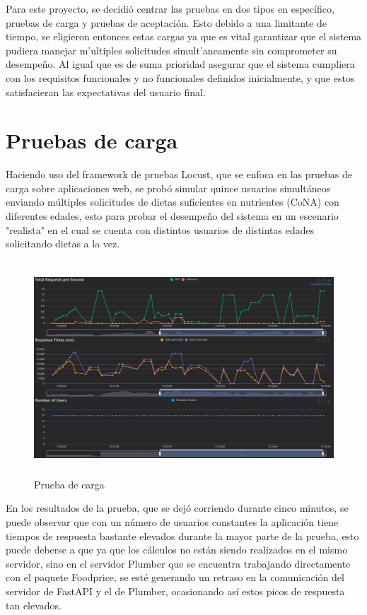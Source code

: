 
\noindent Para este proyecto, se decidi\'o centrar las pruebas en dos tipos en espec\'ifico, pruebas de carga y pruebas de aceptaci\'on. Esto  debido a una limitante de tiempo, se eligieron entonces estas cargas ya que es vital garantizar que el sistema pudiera manejar m'ultiples solicitudes simult'aneamente sin comprometer su desempe\~no. Al igual que es de suma prioridad  asegurar que el sistema cumpliera con los requisitos funcionales y no funcionales definidos inicialmente, y que estos satisfacieran las expectativas del usuario final. 

\section{Pruebas de carga}
\noindent Haciendo uso del framework de pruebas Locust, que se enfoca en las pruebas de carga sobre aplicaciones web, se prob\'o simular quince usuarios simult\'aneos enviando m\'ultiples solicitudes de dietas suficientes en nutrientes (CoNA) con diferentes edades, esto para probar el desempe\~no del sistema en un escenario "realista" en el cual se cuenta con distintos usuarios de distintas edades solicitando dietas a la vez.

\begin{figure}[H]
    \centering
    \includegraphics[height=8cm]{img/validacion/Carga.png}
    \caption{Prueba de carga}
    \label{fig:carga}
\end{figure}

En los resultados de la prueba, que se dej\'o corriendo durante cinco minutos, se puede observar que con un n\'umero de usuarios constantes la aplicaci\'on tiene tiempos de respuesta bastante elevados durante la mayor parte de la prueba, esto puede deberse a que ya que los c\'alculos no est\'an siendo realizados en el mismo servidor, sino en el servidor Plumber que se encuentra trabajando directamente con el paquete Foodprice, se est\'e generando un retraso en la comunicaci\'on del servidor de FastAPI y el de Plumber, ocasionando as\'i estos picos de respuesta tan elevados.
\\
\\
